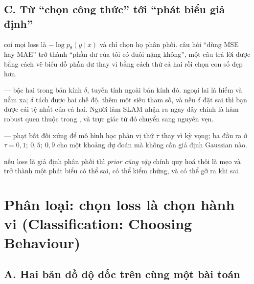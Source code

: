 \documentclass[../../deep_learning.tex]{subfiles}
\begin{document}
\subsection{C. Từ ``chọn công thức'' tới ``phát biểu giả định''}

\begin{mach}
\item {} \gp coi mọi loss là \(-\log p_\theta(y\mid x)\) và chỉ chọn họ phân phối. \hq câu hỏi ``dùng MSE hay MAE'' trở thành ``phần dư của tôi có đuôi nặng không'', một câu trả lời được bằng cách vẽ biểu đồ phần dư thay vì bằng cách thử cả hai rồi chọn con số đẹp hơn.
\item {} \gp {} --- bậc hai trong bán kính \(\delta\), tuyến tính ngoài bán kính đó. \gd ngoại lai là hiếm và nằm xa; \(\delta\) tách được hai chế độ. \gia thêm một siêu tham số, và nếu \(\delta\) đặt sai thì bạn được cái tệ nhất của cả hai. Người làm SLAM nhận ra ngay đây chính là hàm robust quen thuộc trong , và trực giác từ đó chuyển sang nguyên vẹn.
\item {} \gp {} --- phạt bất đối xứng để mô hình học phân vị thứ \(\tau\) thay vì kỳ vọng; ba đầu ra ở \(\tau = 0{,}1;\ 0{,}5;\ 0{,}9\) cho một khoảng dự đoán mà không cần giả định Gaussian nào.
\item \vdm nếu loss là giả định phân phối thì \emph{prior cũng vậy} \ra chính quy hoá thôi là mẹo và trở thành một phát biểu có thể sai, có thể kiểm chứng, và có thể gỡ ra khi sai.
\end{mach}

\section{Phân loại: chọn loss là chọn hành vi (Classification: Choosing Behaviour)}

\subsection{A. Hai bản đồ độ dốc trên cùng một bài toán}
\end{document}
